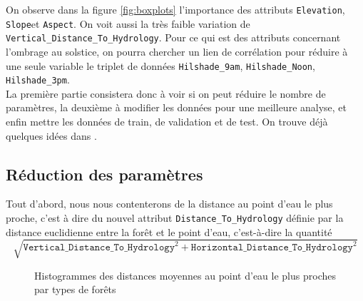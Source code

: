 \documentclass[12pt,a4paper]{article}
\numberwithin{equation}{section}
\newcommand{\elevation}{\texttt{Elevation}}
\newcommand{\aspect}{\texttt{Aspect}}
\newcommand{\slope}{\texttt{Slope}}
\newcommand{\hhydro}{\texttt{Horizontal\_Distance\_To\_Hydrology}}
\newcommand{\vhydro}{\texttt{Vertical\_Distance\_To\_Hydrology}}
\newcommand{\hilshadeM}{\texttt{Hilshade\_9am}}
\newcommand{\hilshadeN}{\texttt{Hilshade\_Noon}}
\newcommand{\hilshadeA}{\texttt{Hilshade\_3pm}}
\begin{document}
	On observe dans la figure \ref{fig:boxplots} l'importance des attributs \elevation, \slope et \aspect. On voit aussi la très faible variation de \vhydro. Pour ce qui est des attributs concernant l'ombrage au solstice, on pourra chercher un lien de corrélation pour réduire à une seule variable le triplet de données \hilshadeM, \hilshadeN, \hilshadeA.\\
	
	La première partie consistera donc à voir si on peut réduire le nombre de paramètres, la deuxième à modifier les données pour une meilleure analyse, et enfin mettre les données de train, de validation et de test. On trouve déjà quelques idées dans \cite{B-D}.
	
	\newpage
	
	\subsection{Réduction des paramètres}
	
	Tout d'abord, nous nous contenterons de la distance au point d'eau le plus proche, c'est à dire du nouvel attribut \verb!Distance_To_Hydrology! définie par la distance euclidienne entre la forêt et le point d'eau, c'est-à-dire la quantité $$ \sqrt{ \vhydro^2 +  \hhydro^2}$$
	
	\begin{figure}[h]
		\centering
		\hfill
		\hfill
	\caption{Histogrammes des distances moyennes au point d'eau le plus proches par types de forêts}
	\label{fig:disthist}
	\end{figure}
	
\end{document}
